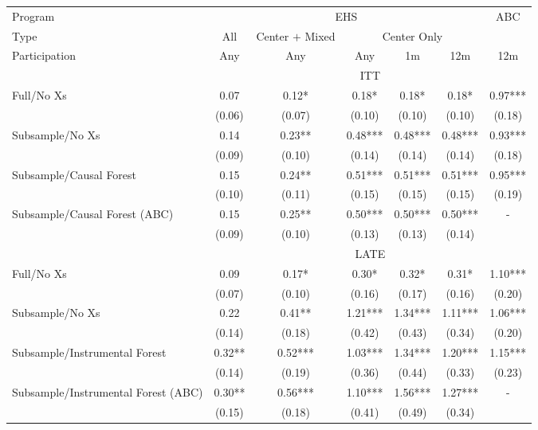 \begin{tabular}{lcccccc}
\toprule 
\midrule 
Program  & \multicolumn{5}{c}{EHS} & ABC \\
 \cmidrule(lr){1-1} \cmidrule(lr){2-6} \cmidrule(lr){7-7} 
Type & All & Center $+$ Mixed & \multicolumn{3}{c}{Center Only} &  \\
 \cmidrule(lr){1-1} \cmidrule(lr){2-2} \cmidrule(lr){3-3} \cmidrule(lr){4-6} 
Participation & Any & Any & Any & 1m & 12m & 12m \\
\midrule 
 & \multicolumn{6}{c}{ITT} \\
 \cmidrule(lr){2-7} 
Full/No Xs & 0.07 & 0.12* & 0.18* & 0.18* & 0.18* & 0.97*** \\
 & (0.06) & (0.07) & (0.10) & (0.10) & (0.10) & (0.18) \\
Subsample/No Xs & 0.14 & 0.23** & 0.48*** & 0.48*** & 0.48*** & 0.93*** \\
 & (0.09) & (0.10) & (0.14) & (0.14) & (0.14) & (0.18) \\
Subsample/Causal Forest & 0.15 & 0.24** & 0.51*** & 0.51*** & 0.51*** & 0.95*** \\
 & (0.10) & (0.11) & (0.15) & (0.15) & (0.15) & (0.19) \\
Subsample/Causal Forest (ABC) & 0.15 & 0.25** & 0.50*** & 0.50*** & 0.50*** & - \\
 & (0.09) & (0.10) & (0.13) & (0.13) & (0.14) \\
\midrule 
 & \multicolumn{6}{c}{LATE} \\
 \cmidrule(lr){2-7} 
Full/No Xs & 0.09 & 0.17* & 0.30* & 0.32* & 0.31* & 1.10*** \\
 & (0.07) & (0.10) & (0.16) & (0.17) & (0.16) & (0.20) \\
Subsample/No Xs & 0.22 & 0.41** & 1.21*** & 1.34*** & 1.11*** & 1.06*** \\
 & (0.14) & (0.18) & (0.42) & (0.43) & (0.34) & (0.20) \\
Subsample/Instrumental Forest & 0.32** & 0.52*** & 1.03*** & 1.34*** & 1.20*** & 1.15*** \\
 & (0.14) & (0.19) & (0.36) & (0.44) & (0.33) & (0.23) \\
Subsample/Instrumental Forest (ABC) & 0.30** & 0.56*** & 1.10*** & 1.56*** & 1.27*** & - \\
 & (0.15) & (0.18) & (0.41) & (0.49) & (0.34) \\
\midrule 
\bottomrule 
\end{tabular}
